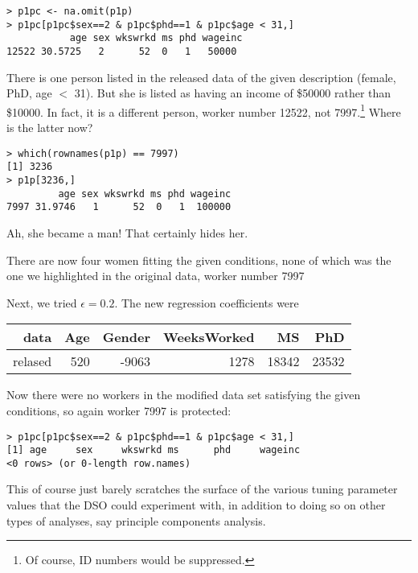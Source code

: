 \documentclass[11pt]{article}
\begin{document}
\begin{lstlisting}
> p1pc <- na.omit(p1p)
> p1pc[p1pc$sex==2 & p1pc$phd==1 & p1pc$age < 31,]
           age sex wkswrkd ms phd wageinc
12522 30.5725   2      52  0   1   50000 
\end{lstlisting}

There is one person listed in the released data of the given description
(female, PhD, age $<$ 31).  But she is listed as having an income of
\$50000 rather than \$10000.  In fact, it is a different person, worker
number 12522, not 7997.\footnote{Of course, ID numbers would be suppressed.}
Where is the latter now?

\begin{lstlisting}
> which(rownames(p1p) == 7997)
[1] 3236
> p1p[3236,]
         age sex wkswrkd ms phd wageinc
7997 31.9746   1      52  0   1  100000
\end{lstlisting}

Ah, she became a man!  That certainly hides her.  

There are now four women fitting the given conditions, none of which was
the one we highlighted in the original data, worker number
7997

Next, we tried $\epsilon = 0.2$.  The new regression coefficients were


\begin{tabular}{|r|r|r|r|r|r|}
\hline
data & Age & Gender & WeeksWorked & MS & PhD \\ \hline 
relased & 520  & -9063  & 1278 & 18342 & 23532 \\ \hline 
\end{tabular}

Now there were no workers in the modified data set satisfying
the given conditions, so again worker 7997 is protected:

\begin{lstlisting}
> p1pc[p1pc$sex==2 & p1pc$phd==1 & p1pc$age < 31,]
[1] age     sex     wkswrkd ms      phd     wageinc
<0 rows> (or 0-length row.names)
\end{lstlisting}

This of course just barely scratches the surface of the various tuning
parameter values that the DSO could experiment with, in addition to
doing so on other types of analyses, say principle components analysis.
\end{document}
